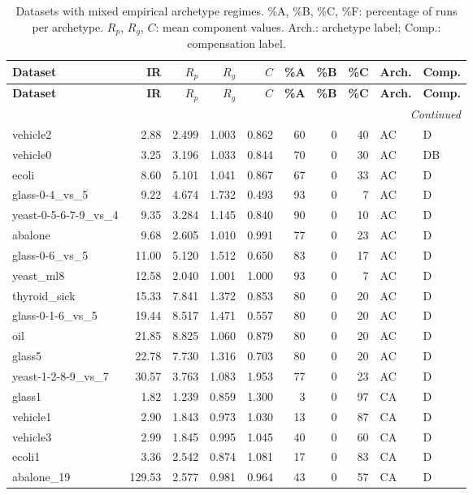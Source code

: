 \begin{longtable}{lrrrrrrrll}
\caption{Datasets with mixed empirical archetype regimes. \%A, \%B, \%C, \%F: percentage of runs per archetype. $R_p$, $R_g$, $C$: mean component values. Arch.: archetype label; Comp.: compensation label.}
\label{tab:mixed_regimes} \\
\toprule
\textbf{Dataset} & \textbf{IR} & \textbf{$R_p$} & \textbf{$R_g$} & \textbf{$C$} & \textbf{\%A} & \textbf{\%B} & \textbf{\%C} & \textbf{Arch.} & \textbf{Comp.} \\
\midrule
\endfirsthead
\toprule
\textbf{Dataset} & \textbf{IR} & \textbf{$R_p$} & \textbf{$R_g$} & \textbf{$C$} & \textbf{\%A} & \textbf{\%B} & \textbf{\%C} & \textbf{Arch.} & \textbf{Comp.} \\
\midrule
\endhead
\midrule \multicolumn{11}{r}{\textit{Continued}} \\
\endfoot
\bottomrule
\endlastfoot
    vehicle2 & 2.88 & 2.499 & 1.003 & 0.862 & 60 & 0 & 40 & AC & D \\
    vehicle0 & 3.25 & 3.196 & 1.033 & 0.844 & 70 & 0 & 30 & AC & DB \\
    ecoli & 8.60 & 5.101 & 1.041 & 0.867 & 67 & 0 & 33 & AC & D \\
    glass-0-4\_vs\_5 & 9.22 & 4.674 & 1.732 & 0.493 & 93 & 0 & 7 & AC & D \\
    yeast-0-5-6-7-9\_vs\_4 & 9.35 & 3.284 & 1.145 & 0.840 & 90 & 0 & 10 & AC & D \\
    abalone & 9.68 & 2.605 & 1.010 & 0.991 & 77 & 0 & 23 & AC & D \\
    glass-0-6\_vs\_5 & 11.00 & 5.120 & 1.512 & 0.650 & 83 & 0 & 17 & AC & D \\
    yeast\_ml8 & 12.58 & 2.040 & 1.001 & 1.000 & 93 & 0 & 7 & AC & D \\
    thyroid\_sick & 15.33 & 7.841 & 1.372 & 0.853 & 80 & 0 & 20 & AC & D \\
    glass-0-1-6\_vs\_5 & 19.44 & 8.517 & 1.471 & 0.557 & 80 & 0 & 20 & AC & D \\
    oil & 21.85 & 8.825 & 1.060 & 0.879 & 80 & 0 & 20 & AC & D \\
    glass5 & 22.78 & 7.730 & 1.316 & 0.703 & 80 & 0 & 20 & AC & D \\
    yeast-1-2-8-9\_vs\_7 & 30.57 & 3.763 & 1.083 & 1.953 & 77 & 0 & 23 & AC & D \\
    glass1 & 1.82 & 1.239 & 0.859 & 1.300 & 3 & 0 & 97 & CA & D \\
    vehicle1 & 2.90 & 1.843 & 0.973 & 1.030 & 13 & 0 & 87 & CA & D \\
    vehicle3 & 2.99 & 1.845 & 0.995 & 1.045 & 40 & 0 & 60 & CA & D \\
    ecoli1 & 3.36 & 2.542 & 0.874 & 1.081 & 17 & 0 & 83 & CA & D \\
    abalone\_19 & 129.53 & 2.577 & 0.981 & 0.964 & 43 & 0 & 57 & CA & D \\
\end{longtable}
